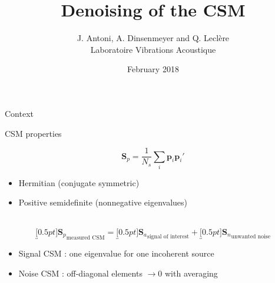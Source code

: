 \documentclass[10pt,xcolor=x11names,compress, notes=show]{beamer}%
\author{J. {Antoni}, A. {Dinsenmeyer} and Q. {Leclère} \\ Laboratoire Vibrations Acoustique}
\title{Denoising of the CSM}
\subtitle{}
\date{February 2018}
\begin{document}
\begin{frame}
	\maketitle
\end{frame}

\begin{frame}{Context}

\end{frame}

\begin{frame}{CSM properties}

$$\bm{S}_{p} = \frac{1}{N_s} \sum_i  \bm{p}_i\bm{p}_i'$$
\begin{itemize}
   	 \item Hermitian (conjugate symmetric)
   	 \item Positive semidefinite (nonnegative eigenvalues)
\end{itemize}~\\

$$\underbracket[0.5pt]{\bm{S}_p}_{\text{measured CSM}} =\underbracket[0.5pt]{ \bm{S}_a}_{\text{signal of interest}} +\underbracket[0.5pt]{\bm{S}_n}_{\text{unwanted noise}}$$

\begin{itemize}
     \item Signal CSM : one eigenvalue for one incoherent source
    \item Noise CSM : off-diagonal elements $\rightarrow 0$ with averaging
\end{itemize}
\end{frame}
\end{document}
